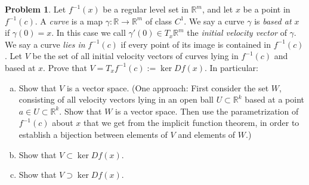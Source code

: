 \documentclass{amsart}
\newcommand{\+}[1]{\ensuremath{\mathbf{#1}}}
\newcommand{\R}{{\mathbb R}}
\theoremstyle{definition}
\newtheorem{prob}{Problem}
\begin{document}
\begin{prob}
 Let $f^{-1}(x)$ be a regular level set in $\R^m$, and
 let $x$ be a point in $f^{-1}(c)$.
 A \emph{curve} is a map  $\gamma: \R \to \R^m$ of class $C^1$.
 We say a curve $\gamma$ is \emph{based at $x$} if $\gamma(0) = x$.
 In this case we call $\gamma'(0) \in T_x\R^m$ the \emph{initial velocity vector} of $\gamma$.
 We say a curve \emph{lies in} $f^{-1}(c)$ if every point of its image is contained in $f^{-1}(c)$.
 Let $V$ be the set of all initial velocity vectors of curves lying in $f^{-1}(c)$ and based at $x$.
 Prove that $V = T_x f^{-1}(c) := \ker Df(x)$.  In particular:
 \begin{enumerate}[(a)]
  \item Show that $V$ is a vector space. (One approach: First consider the set $W$, consisting of all velocity vectors
  lying in an open ball $U \subset \R^k$ based at a point $a \in U \subset \R^k$.
  Show that $W$ is a vector space.  Then use the parametrization
  of $f^{-1}(c)$ about $x$ that we get from the implicit function theorem,
  in order to establish a bijection between elements of $V$ and elements of $W$.)
  \item Show that $V \subset  \ker Df(x)$.
  \item Show that $V \supset  \ker Df(x)$.
 \end{enumerate}
\end{prob}
\end{document}
